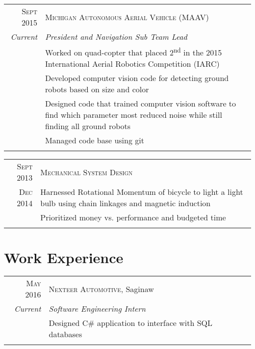 \documentclass[a4paper,10pt]{article} %
\begin{document}
\begin{tabular}{r|p{13cm}}
\textsc{Sept 2015} & \textsc{Michigan Autonomous Aerial Vehicle (MAAV)} \\
\emph{Current} & \emph{President and Navigation Sub Team Lead} \\
& \footnotesize{Worked on quad-copter that placed 2\textsuperscript{nd} in the 2015 International Aerial Robotics Competition (IARC)} \\
& \footnotesize{Developed computer vision code for detecting ground robots based on size and color} \\
& \footnotesize{Designed code that trained computer vision software to find which parameter most reduced noise while still finding all ground robots} \\
& \footnotesize{Managed code base using git} \\
\multicolumn{2}{c}{} \\
\end{tabular}


\begin{tabular}{r|p{13cm}}
\textsc{Sept 2013} & \textsc{Mechanical System Design} \\
\textsc{Dec 2014} & \footnotesize{Harnessed Rotational Momentum of bicycle to light a light bulb using chain linkages and magnetic induction} \\
& \footnotesize{Prioritized money vs. performance and budgeted time} \\
\multicolumn{2}{c}{} \\
\end{tabular}


\section{Work Experience}

\begin{tabular}{r|p{13cm}}
\textsc{May 2016} & \textsc{Nexteer Automotive}, Saginaw \\
\emph{Current} & \emph{Software Engineering Intern} \\
& \footnotesize{Designed C\# application to interface with SQL databases} \\
\multicolumn{2}{c}{} \\
\end{tabular}
\end{document}

